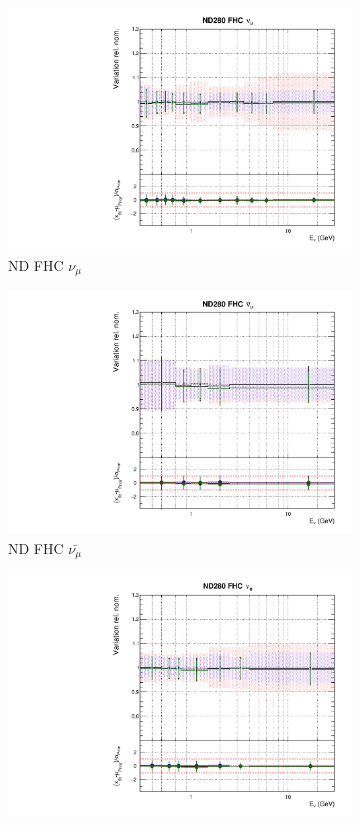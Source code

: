 \begin{figure}[!htbp]
\begin{subfigure}{0.45\textwidth}
  \centering
  \includegraphics[width=0.75\linewidth]{figs/polyasmvsflux_0}
  \caption{ND FHC $\nu_{\mu}$}
\end{subfigure}
\begin{subfigure}{0.45\textwidth}
  \centering
  \includegraphics[width=0.75\linewidth]{figs/polyasmvsflux_1}
  \caption{ND FHC $\bar{\nu_{\mu}}$}
\end{subfigure}
\begin{subfigure}{0.45\textwidth}
  \centering
  \includegraphics[width=0.75\linewidth]{figs/polyasmvsflux_2}

\end{subfigure}
\end{figure}
